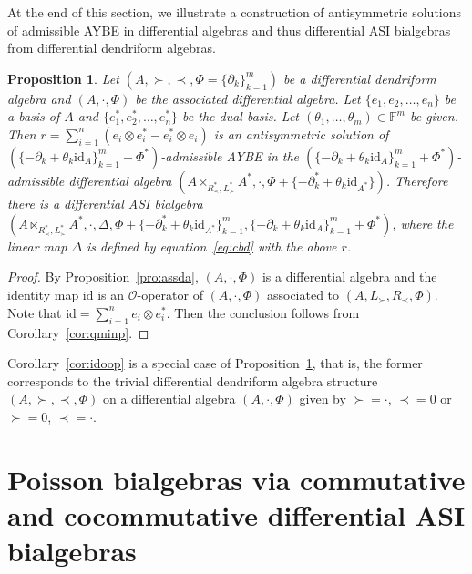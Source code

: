 \documentclass[pdftex]{sigma}
\numberwithin{equation}{section}
\newtheorem{Proposition}[Theorem]{Proposition}
{ \theoremstyle{definition}
	\newtheorem{Definition}[Theorem]{Definition}
	\newtheorem{Note}[Theorem]{Note}
	\newtheorem{Example}[Theorem]{Example}
	\newtheorem{Remark}[Theorem]{Remark} }
\newcommand{\id}{\mathrm{id}}
\begin{document}
At the end of this section, we illustrate a construction of
antisymmetric solutions of admissible AYBE in differential
algebras and thus differential ASI bialgebras from differential
dendriform algebras.

\begin{Proposition}\label{pro:denddasi}
 Let $(A, \succ, \prec, \Phi = \{\partial_k\}_{k=1}^m)$ be a differential dendriform algebra and $(A, \cdot, \Phi)$ be the associated differential algebra.
 Let $\{e_1, e_2, \dots, e_n\}$ be a basis of $A$ and $\{e_1^*, e_2^*, \dots, e_n^*\}$ be the dual basis.
 Let $(\theta_1, \dots, \theta_m) \in \mathbb{F}^m$ be given.
 Then $r = \sum_{i=1}^n (e_i \otimes e_i^* - e_i^* \otimes e_i)$ is an antisymmetric solution of
 $(\{-\partial_k + \theta_k \id_A\}_{k=1}^m + \Phi^*)$-admissible AYBE in the
 $(\{-\partial_k + \theta_k \id_A\}_{k=1}^m + \Phi^*)$-admissible differential algebra
 $(A \ltimes_{R^*_{\prec}, L^*_{\succ}}A^*, \cdot, \Phi + \{-\partial_k^* + \theta_k \id_{A^*}\})$.
 Therefore there is a differential ASI bialgebra
 $(A \ltimes_{R^*_{\prec}, L^*_{\succ}}A^*, \cdot, \Delta, \Phi + \{-\partial_k^* + \theta_k \id_{A^*}\}_{k=1}^m, \{-\partial_k + \theta_k \id_A\}_{k=1}^m + \Phi^*)$,
 where the linear map $\Delta$ is defined by equation~\eqref{eq:cbd} with the above $r$.
\end{Proposition}
\begin{proof}
 By Proposition~\ref{pro:assda}, $(A, \cdot, \Phi)$ is a differential algebra and the identity map $\id$ is an $\mathcal{O}$-operator of $(A, \cdot, \Phi)$ associated to $(A,L_\succ, R_\prec, \Phi)$.
 Note that $\id = \sum^n_{i=1} e_i\otimes e_i^*$.
 Then the conclusion follows from Corollary~\ref{cor:qminp}.
\end{proof}

\begin{Remark}Corollary~\ref{cor:idoop} is a special case of Proposition~\ref{pro:denddasi},
 that is, the former corresponds to the trivial differential dendriform algebra structure
 $(A, \succ, \prec, \Phi)$ on a differential algebra $(A, \cdot, \Phi)$ given by $\succ = \cdot$, $\prec = 0$ or $\succ = 0$, $\prec = \cdot$.
\end{Remark}

\section[Poisson bialgebras via commutative and cocommutative differential ASI bialgebras]{Poisson bialgebras via commutative\\ and cocommutative differential ASI bialgebras}\label{sec:poisson}
\end{document}
